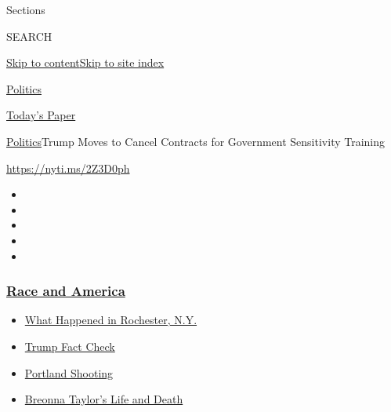 Sections

SEARCH

\protect\hyperlink{site-content}{Skip to
content}\protect\hyperlink{site-index}{Skip to site index}

\href{https://www.nytimes3xbfgragh.onion/section/politics}{Politics}

\href{https://myaccount.nytimes3xbfgragh.onion/auth/login?response_type=cookie\&client_id=vi}{}

\href{https://www.nytimes3xbfgragh.onion/section/todayspaper}{Today's
Paper}

\href{/section/politics}{Politics}\textbar{}Trump Moves to Cancel
Contracts for Government Sensitivity Training

\url{https://nyti.ms/2Z3D0ph}

\begin{itemize}
\item
\item
\item
\item
\item
\end{itemize}

\hypertarget{race-and-america}{%
\subsubsection{\texorpdfstring{\href{https://www.nytimes3xbfgragh.onion/news-event/george-floyd-protests-minneapolis-new-york-los-angeles?name=styln-george-floyd\&region=TOP_BANNER\&block=storyline_menu_recirc\&action=click\&pgtype=Article\&impression_id=b1f8d550-f27d-11ea-93ae-4d5a8961aa3b\&variant=undefined}{Race
and America}}{Race and America}}\label{race-and-america}}

\begin{itemize}
\tightlist
\item
  \href{https://www.nytimes3xbfgragh.onion/2020/09/04/nyregion/rochester-police-daniel-prude.html?name=styln-george-floyd\&region=TOP_BANNER\&block=storyline_menu_recirc\&action=click\&pgtype=Article\&impression_id=b1f8fc60-f27d-11ea-93ae-4d5a8961aa3b\&variant=undefined}{What
  Happened in Rochester, N.Y.}
\item
  \href{https://www.nytimes3xbfgragh.onion/2020/09/01/us/politics/trump-fact-check-protests.html?name=styln-george-floyd\&region=TOP_BANNER\&block=storyline_menu_recirc\&action=click\&pgtype=Article\&impression_id=b1f8fc61-f27d-11ea-93ae-4d5a8961aa3b\&variant=undefined}{Trump
  Fact Check}
\item
  \href{https://www.nytimes3xbfgragh.onion/2020/08/30/us/portland-shooting-explained.html?name=styln-george-floyd\&region=TOP_BANNER\&block=storyline_menu_recirc\&action=click\&pgtype=Article\&impression_id=b1f8fc62-f27d-11ea-93ae-4d5a8961aa3b\&variant=undefined}{Portland
  Shooting}
\item
  \href{https://www.nytimes3xbfgragh.onion/2020/08/30/us/breonna-taylor-police-killing.html?name=styln-george-floyd\&region=TOP_BANNER\&block=storyline_menu_recirc\&action=click\&pgtype=Article\&impression_id=b1f8fc63-f27d-11ea-93ae-4d5a8961aa3b\&variant=undefined}{Breonna
  Taylor's Life and Death}
\end{itemize}

